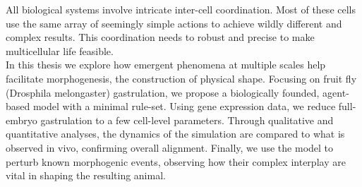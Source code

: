 All biological systems involve intricate inter-cell coordination. Most of these cells use the same array of seemingly simple actions to achieve wildly different and complex results. This coordination needs to robust and precise to make multicellular life feasible. \\

In this thesis we explore how emergent phenomena at multiple scales help facilitate morphogenesis, the construction of physical shape. Focusing on fruit fly (Drosphila melongaster) gastrulation, we propose a biologically founded, agent-based model with a minimal rule-set. Using gene expression data, we reduce full-embryo gastrulation to a few cell-level parameters.
Through qualitative and quantitative analyses, the dynamics of the simulation are compared to what is observed in vivo, confirming overall alignment. 
Finally, we use the model to perturb known morphogenic events, observing how their complex interplay are vital in shaping the resulting animal.